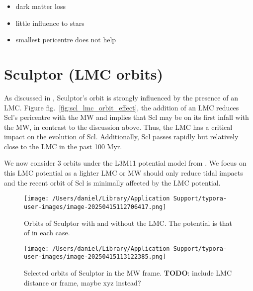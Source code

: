 \begin{itemize}
\tightlist
\item
  dark matter loss
\item
  little influence to stars
\item
  smallest pericentre does not help
\end{itemize}

\section{Sculptor (LMC orbits)}\label{sculptor-lmc-orbits}

As discussed in \citet{battaglia+2022}, Sculptor's orbit is strongly
influenced by the presence of an LMC. Figure
fig.~\ref{fig:scl_lmc_orbit_effect}, the addition of an LMC reduces
Scl's pericentre with the MW and implies that Scl may be on its first
infall with the MW, in contrast to the discussion above. Thus, the LMC
has a critical impact on the evolution of Scl. Additionally, Scl passes
rapidly but relatively close to the LMC in the past 100 Myr.

We now consider 3 orbits under the L3M11 potential model from
\citet{vasiliev2024}. We focus on this LMC potential as a lighter LMC or
MW should only reduce tidal impacts and the recent orbit of Scl is
minimally affected by the LMC potential.

\begin{figure}
\centering
\texttt{[image: /Users/daniel/Library/Application Support/typora-user-images/image-20250415112706417.png]}
\caption[Effect of LMC on Sculptor's Orbit]{Orbits of Sculptor with and
without the LMC. The potential is that of \citet{vasiliev+2021} in each
case.}
\end{figure}

\begin{figure}
\centering
\texttt{[image: /Users/daniel/Library/Application Support/typora-user-images/image-20250415113122385.png]}
\caption[Selected orbits of Sculptor with an LMC]{Selected orbits of
Sculptor in the MW frame. \textbf{TODO}: include LMC distance or frame,
maybe xyz instead?}
\end{figure}
